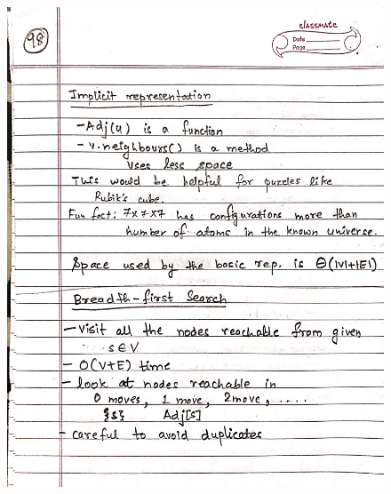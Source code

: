 \begin{figure}[H]
    \centering
    \includegraphics[width=16cm, height=21cm]{"./MIT-6.006/MIT-6006-098"}
\end{figure}
\newpage
